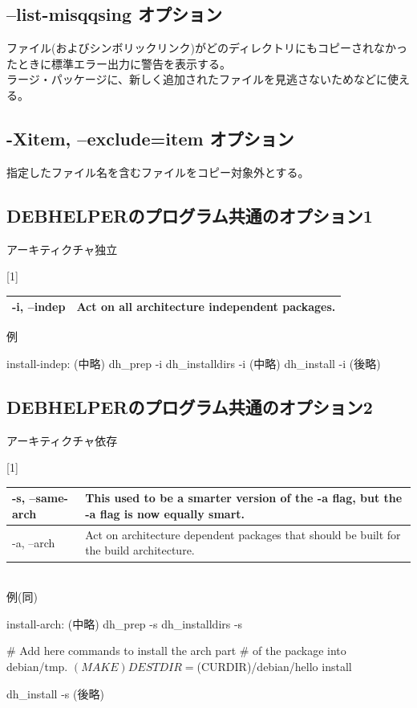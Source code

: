 \documentclass[mingoth,a4paper]{jsarticle}
\begin{document}
\subsection{--list-misqqsing オプション}
ファイル(およびシンボリックリンク)がどのディレクトリにもコピーされなかったときに標準エラー出力に警告を表示する。
\\
ラージ・パッケージに、新しく追加されたファイルを見逃さないためなどに使える。


\subsection{-Xitem, --exclude=item オプション}
指定したファイル名を含むファイルをコピー対象外とする。

\newpage

\subsection[containsverbatim]{DEBHELPERのプログラム共通のオプション1}
アーキティクチャ独立
\begin{table}[htb]
\scalebox{1}[1]{
\begin{tabular}{|l|p{30em}|} \hline
-i, --indep & Act on all architecture independent packages. \\ \hline
\end{tabular}
}
\end{table}

例
\begin{commandline}
install-indep:
	(中略)
        dh_prep -i 
        dh_installdirs -i
	(中略)
        dh_install -i
	(後略)
\end{commandline}


\subsection[containsverbatim]{DEBHELPERのプログラム共通のオプション2}
アーキティクチャ依存
\begin{table}[htb]
\scalebox{1}[1]{
\begin{tabular}{|l|p{30em}|} \hline
-s, --same-arch & This used to be a smarter version of the -a flag, but the -a flag is now equally smart. \\ \hline
-a, --arch & Act on architecture dependent packages that should be built for the build architecture. \\ \hline
\end{tabular}
}
\end{table}
\\
例(同)
\begin{commandline}
install-arch:
	(中略)
        dh_prep -s 
        dh_installdirs -s

        # Add here commands to install the arch part 
        # of the package into debian/tmp.
        $(MAKE) DESTDIR=$(CURDIR)/debian/hello install

        dh_install -s
	(後略)
\end{commandline}
\end{document}
